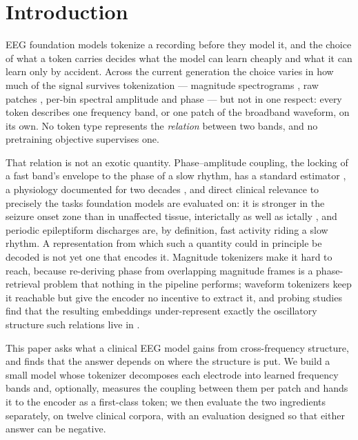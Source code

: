 \section{Introduction}
\label{sec:intro}

EEG foundation models tokenize a recording before they model it, and the
choice of what a token carries decides what the model can learn cheaply and
what it can learn only by accident. Across the current generation the
choice varies in how much of the signal survives tokenization --- magnitude
spectrograms \citep{yang2023biot,pradeepkumar2026tfm}, raw patches
\citep{wang2025cbramod,wang2024eegpt}, per-bin spectral amplitude and phase
\citep{jiang2024labram} --- but not in one respect: every token describes
one frequency band, or one patch of the broadband waveform, on its own. No
token type represents the \emph{relation} between two bands, and no
pretraining objective supervises one.

That relation is not an exotic quantity. Phase--amplitude coupling, the
locking of a fast band's envelope to the phase of a slow rhythm, has a
standard estimator \citep{tort2010measuring}, a physiology documented for
two decades \citep{canolty2006high,canolty2010functional}, and direct
clinical relevance to precisely the tasks foundation models are evaluated
on: it is stronger in the seizure onset zone than in unaffected tissue,
interictally as well as ictally \citep{amiri2016phase}, and periodic
epileptiform discharges are, by definition, fast activity riding a slow
rhythm. A representation from which such a quantity could in principle be
decoded is not yet one that encodes it. Magnitude tokenizers make it hard
to reach, because re-deriving phase from overlapping magnitude frames is a
phase-retrieval problem \citep{griffin1984signal} that nothing in the
pipeline performs; waveform tokenizers keep it reachable but give the
encoder no incentive to extract it, and probing studies find that the
resulting embeddings under-represent exactly the oscillatory structure
such relations live in \citep{kommineni2026aperiodic}.

This paper asks what a clinical EEG model gains from cross-frequency
structure, and finds that the answer depends on where the structure is
put. We build a small model whose tokenizer decomposes each electrode into
learned frequency bands and, optionally, measures the coupling between
them per patch and hands it to the encoder as a first-class token; we then
evaluate the two ingredients separately, on twelve clinical corpora, with
an evaluation designed so that either answer can be negative.

